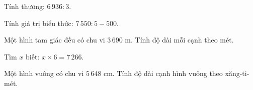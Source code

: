 \begin{ex} %
Tính thương: $6\,936 : 3$.
\end{ex}

\begin{ex} %
Tính giá trị biểu thức: $7\,550 : 5 - 500$.
\end{ex}

\begin{ex} %
Một hình tam giác đều có chu vi $3\,690\text{ m}$. Tính độ dài mỗi cạnh theo mét.
\end{ex}

\begin{ex} %
Tìm $x$ biết: $x \times 6 = 7\,266$.
\end{ex}

\begin{ex} %
Một hình vuông có chu vi $5\,648\text{ cm}$. Tính độ dài cạnh hình vuông theo xăng-ti-mét.
\end{ex}
